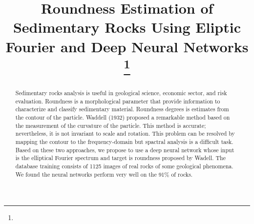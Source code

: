 \documentclass[conference]{IEEEtran}
\begin{document}
\title{Roundness Estimation of Sedimentary Rocks Using Eliptic Fourier and Deep Neural Networks\\
{\footnotesize \textsuperscript{}}
\thanks{}
}

\author{
\and
{}
\and
{}
}

\maketitle

\thispagestyle{firststyle}
\renewcommand{\headrulewidth}{0in}
\pagestyle{empty}


\pagestyle{fancy}



\begin{abstract}

Sedimentary rocks analysis is useful in geological science, economic sector, and risk evaluation. Roundness is a morphological parameter that provide information to characterize and classify sedimentary material.  Roundness degrees is estimates from the contour of the particle. Waddell (1932) proposed a remarkable method based on the measurement of the curvature of the particle.  This method is accurate; nevertheless, it is not invariant to scale and rotation. This problem can be resolved by mapping the contour to the frequency-domain but spactral analysis is a difficult task. Based on these two approaches, we propose to use a deep neural network whose input is the elliptical Fourier spectrum and target is roundness proposed by Wadell. The database training consists of 1125 images of real rocks of some geological phenomena. We found the neural networks perform very well on the 91\% of rocks.
\end{abstract}
\end{document}
